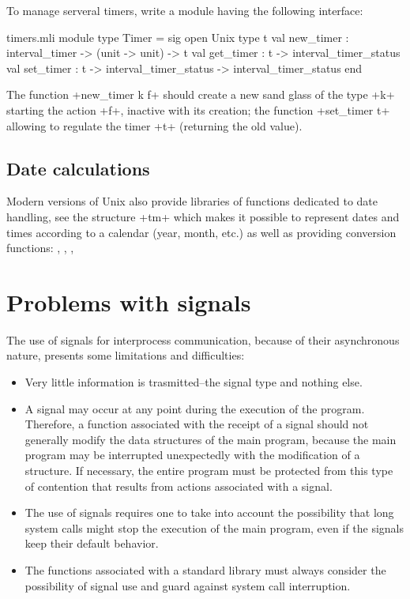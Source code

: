 \begin{exercise}[noanswer]

To manage serveral timers, write a module having the following interface:
%
\begin{listingcodefile}{timers.mli}
module type Timer = sig
  open Unix
  type t
  val new_timer : interval_timer -> (unit -> unit) -> t
  val get_timer : t -> interval_timer_status
  val set_timer : t -> interval_timer_status -> interval_timer_status
end
\end{listingcodefile}
%

The function \ml+new_timer k f+ should create a new sand glass of the 
type \ml+k+ starting the action \ml+f+, inactive with its creation; 
the function \ml+set_timer t+ allowing to regulate the timer \ml+t+ 
(returning the old value). 

\end{exercise}

\subsection* {Date calculations}

Modern versions of Unix also provide libraries of functions dedicated to
date handling, see the structure \ml+tm+ which makes it possible to
represent dates and times according to a calendar (year, month, etc.) as
well as providing conversion functions:
, ,
, \etc

\section{Problems with signals}

The use of signals for interprocess communication, because of 
their asynchronous nature, presents some limitations and difficulties:
%
\begin{itemize}

\item Very little information is trasmitted--the signal 
type and nothing else.

\item A signal may occur at any point during the execution 
of the program.  Therefore, a function associated with the receipt 
of a signal should not generally modify the data structures of 
the main program, because the main program may be interrupted 
unexpectedly with the modification of a structure.  If necessary,
the entire program must be protected from this type of contention that
results from actions associated with a signal.

\item The use of signals requires one to take into account the 
possibility that long system calls might stop the execution of the 
main program, even if the signals keep their default behavior.

\item The functions associated with a standard library must always 
consider the possibility of signal use and guard against system 
call interruption.

\end{itemize}
%

